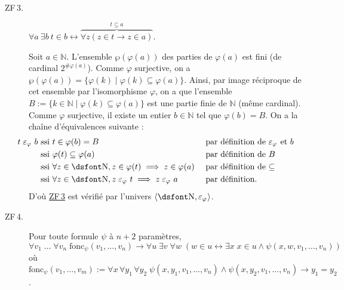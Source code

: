 \documentclass{../notes}
\newcommand\zf[1]{\hyperref[ZF#1]{\textsf{ZF\,#1}}}
\newcommand\inphi[1][\relax]{\ensuremath{\mathrel{\varepsilon_{\varphi_{#1}}}}}
\begin{document}
\begin{enumerate}
\begin{description}
        \item[ZF\,3.] \label{ZF3}
          $\forall  a \: \exists b \: t \in b \leftrightarrow \overbrace{\forall z (z \in t \to z \in a)}^{\textstyle t \subseteq a}$.

          Soit $a \in \mathds{N}$.
          L'ensemble $\wp(\varphi(a))$ des parties de $\varphi(a)$ est fini (de cardinal $2^{\# \varphi(a)}$).
          Comme $\varphi$ surjective, on a $\wp(\varphi(a)) = \{\varphi(k)  \mid  \varphi(k) \subseteq \varphi(a)\}$.
          Ainsi, par image réciproque de cet ensemble par l'isomorphisme $\varphi$, on a que l'ensemble $B := \{k \in \mathds{N}  \mid  \varphi(k) \subseteq \varphi(a)\}$ est une partie finie de $\mathds{N}$ (même cardinal).
          Comme $\varphi$ surjective, il existe un entier $b \in \mathds{N}$ tel que $\varphi(b) = B$.
          On a la chaîne d'équivalences suivante :
          \begin{align*}
            \hspace{-5em}
            t \inphi b & \text{ ssi } t \in \varphi(b) = B && \text{ par définition de $\inphi$ et $b$ }\\
                       & \text{ ssi } \varphi(t) \subseteq \varphi(a) && \text{ par définition de $B$ }\\
                       & \text{ ssi } \forall  z \in \mathds{N}, z \in \varphi(t) \implies z \in \varphi(a) && \text{ par définition de $\subseteq$ }\\
                       & \text{ ssi } \forall z \in \mathds{N}, z \inphi t \implies z \inphi a && \text{ par définition}
          .\end{align*}
          D'où \zf 3 est vérifié par l'univers $\langle \mathds{N}, \inphi \rangle$.

        \item[ZF\,4.] \label{ZF4}
          Pour toute formule $\psi$ à $n+2$ paramètres, 
          \[
            \scriptstyle
            \forall v_1 \; \ldots \; \forall v_n \; \mathrm{fonc}_\psi (v_1, \ldots, v_n) \to \forall u \; \exists v \; \forall w \; 
          (w \in u \leftrightarrow \exists x \; x \in u \land \psi(x, w, v_1, \ldots, v_n))
          \]
          où $ \scriptstyle \mathrm{fonc}_\psi(v_1, \ldots, v_m) := \forall x \, \forall y_1 \, \forall y_2 \; \psi(x, y_1, v_1, \ldots, v_n) \land \psi(x, y_2, v_1, \ldots, v_n) \to y_1 = y_2$.


\end{description}
\end{enumerate}
\end{document}
